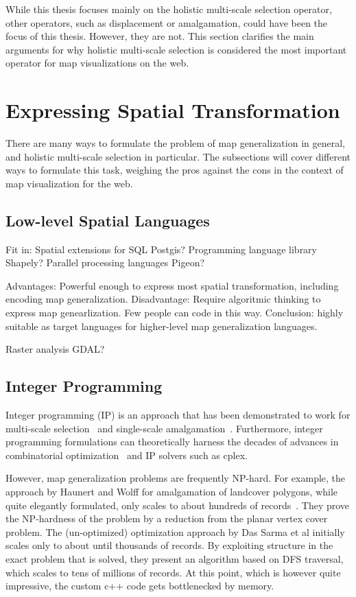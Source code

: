 \documentclass[11pt, oneside]{report}
\begin{document}
While this thesis focuses mainly on the holistic multi-scale selection operator, other operators, such as displacement or amalgamation, could have been the focus of this thesis. However, they are not. This section clarifies the main arguments for why holistic multi-scale selection is considered the most important operator for map visualizations on the web.


\section{Expressing Spatial Transformation}
\label{state:of:the:art:programming:multiscale:selection}



There are many ways to formulate the problem of map generalization in general, and holistic multi-scale selection in particular. The subsections will cover different ways to formulate this task, weighing the pros against the cons in the context of map visualization for the web.

\subsection{Low-level Spatial Languages}

Fit in: Spatial extensions for SQL Postgis? Programming language library Shapely? Parallel processing languages Pigeon?

Advantages: Powerful enough to express most spatial transformation, including encoding map generalization. Disadvantage: Require algoritmic thinking to express map genearlization. Few people can code in this way. Conclusion: highly suitable as target languages for higher-level map generalization languages.


Raster analysis GDAL?

\subsection{Integer Programming}

Integer programming (IP) is an approach that has been demonstrated to work for multi-scale selection~\cite{sarma2012fusiontables} and single-scale amalgamation~\cite{haunert2006landcover}. Furthermore, integer programming formulations can theoretically harness the decades of advances in combinatorial optimization~\cite{branchandbound} and IP solvers such as cplex.

However, map generalization problems are frequently NP-hard. For example, the approach by Haunert and Wolff for amalgamation of landcover polygons, while quite elegantly formulated, only scales to about hundreds of records~\cite{haunert2006landcover}. They prove the NP-hardness of the problem by a reduction from the planar vertex cover problem. The (un-optimized) optimization approach by Das Sarma et al initially scales only to about until thousands of records. By exploiting structure in the exact problem that is solved, they present an algorithm based on DFS traversal, which scales to tens of millions of records. At this point, which is however quite impressive, the custom c++ code gets bottlenecked by memory.
\end{document}
